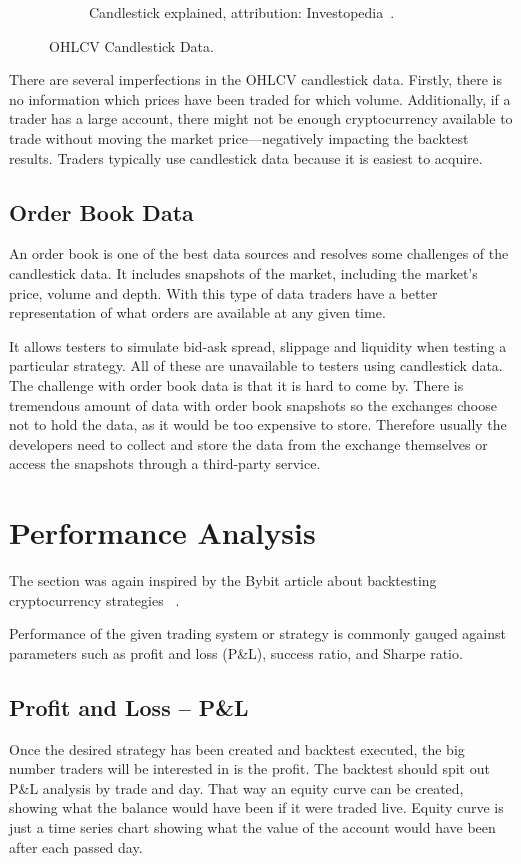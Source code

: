 \begin{figure}
\begin{subfigure}[t]{0.45\textwidth}
        \caption{Candlestick explained, attribution: Investopedia~\cite{investopedia:candlestick-charts}.}
        \label{candlestick-figure}
    \end{subfigure}
    \caption{OHLCV Candlestick Data.}
\end{figure}

There are several imperfections in the OHLCV candlestick data. Firstly, there is no information which prices have been traded for which volume. Additionally, if a trader has a large account, there might not be enough cryptocurrency available to trade without moving the market price---negatively impacting the backtest results. Traders typically use candlestick data because it is easiest to acquire.

\subsection*{Order Book Data}
An order book is one of the best data sources and resolves some challenges of the candlestick data. It includes snapshots of the market, including the market's price, volume and depth. With this type of data traders have a better representation of what orders are available at any given time.

It allows testers to simulate bid-ask spread, slippage and liquidity when testing a particular strategy. All of these are unavailable to testers using candlestick data. The challenge with order book data is that it is hard to come by. There is tremendous amount of data with order book snapshots so the exchanges choose not to hold the data, as it would be too expensive to store. Therefore usually the developers need to collect and store the data from the exchange themselves or access the snapshots through a third-party service.

\section{Performance Analysis}
\label{performance-analysis}
The section was again inspired by the Bybit article about backtesting cryptocurrency strategies ~\cite{backtesting-crypto-trading-strategies}.

Performance of the given trading system or strategy is commonly gauged against parameters such as profit and loss (P\&L), success ratio, and Sharpe ratio.

\subsection*{Profit and Loss -- P\&L}
Once the desired strategy has been created and backtest executed, the big number traders will be interested in is the profit. The backtest should spit out P\&L analysis by trade and day. That way an equity curve can be created, showing what the balance would have been if it were traded live. Equity curve is just a time series chart showing what the value of the account would have been after each passed day.

